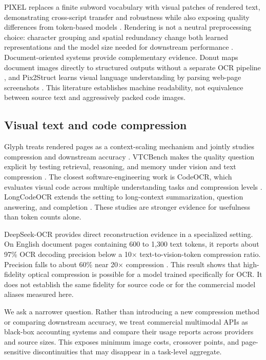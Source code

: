 \documentclass[sigconf,nonacm]{acmart}
\begin{document}
PIXEL replaces a finite subword vocabulary with visual patches of rendered
text, demonstrating cross-script transfer and robustness while also exposing
quality differences from token-based models \cite{rust_2023_pixel}. Rendering
is not a neutral preprocessing choice: character grouping and spatial
redundancy change both learned representations and the model size needed for
downstream performance \cite{lotz_2023_rendering}. Document-oriented systems
provide complementary evidence. Donut maps document images directly to
structured outputs without a separate OCR pipeline \cite{kim_2022_donut}, and
Pix2Struct learns visual language understanding by parsing web-page screenshots
\cite{lee_2023_pix2struct}. This literature establishes machine readability,
not equivalence between source text and aggressively packed code images.

\subsection{Visual text and code compression}

Glyph treats rendered pages as a context-scaling mechanism and jointly studies
compression and downstream accuracy \cite{cheng_2026_glyph}. VTCBench makes the
quality question explicit by testing retrieval, reasoning, and memory under
vision and text compression \cite{vtcbench_2025}. The closest software-engineering
work is CodeOCR, which evaluates visual code across multiple understanding
tasks and compression levels \cite{zhang_2026_codeocr}. LongCodeOCR extends the
setting to long-context summarization, question answering, and completion
\cite{longcodeocr_2026}. These studies are stronger evidence for usefulness
than token counts alone.

DeepSeek-OCR provides direct reconstruction evidence in a specialized setting.
On English document pages containing 600 to 1,300 text tokens, it reports
about 97\% OCR decoding precision below a 10$\times$ text-to-vision-token
compression ratio. Precision falls to about 60\% near 20$\times$ compression
\cite{wei_2025_deepseek_ocr}. This result shows that high-fidelity optical
compression is possible for a model trained specifically for OCR. It does not
establish the same fidelity for source code or for the commercial model aliases
measured here.

We ask a narrower question. Rather than introducing a new compression method or
comparing downstream accuracy, we treat commercial multimodal APIs as black-box
accounting systems and compare their usage reports across providers and source
sizes. This exposes minimum image costs, crossover points, and page-sensitive
discontinuities that may disappear in a task-level aggregate.
\end{document}
